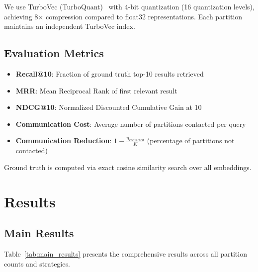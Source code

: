 \documentclass[10pt,twocolumn]{article}
\begin{document}
We use TurboVec (TurboQuant)~\cite{turboquant} with 4-bit quantization (16 quantization levels), achieving 8$\times$ compression compared to float32 representations. Each partition maintains an independent TurboVec index.

\subsection{Evaluation Metrics}

\begin{itemize}
    \item \textbf{Recall@10}: Fraction of ground truth top-10 results retrieved
    \item \textbf{MRR}: Mean Reciprocal Rank of first relevant result
    \item \textbf{NDCG@10}: Normalized Discounted Cumulative Gain at 10
    \item \textbf{Communication Cost}: Average number of partitions contacted per query
    \item \textbf{Communication Reduction}: $1 - \frac{n_{\text{contacted}}}{K}$ (percentage of partitions not contacted)
\end{itemize}

Ground truth is computed via exact cosine similarity search over all embeddings.

\section{Results}

\subsection{Main Results}

Table~\ref{tab:main_results} presents the comprehensive results across all partition counts and strategies.
\end{document}
